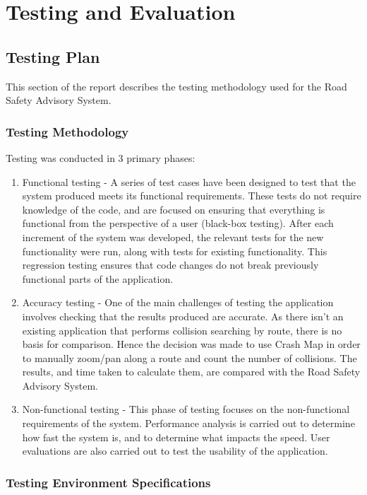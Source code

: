 \documentclass[authoryearcitations]{UoYCSproject}
\begin{document}
\chapter{Testing and Evaluation}

\section{Testing Plan}

This section of the report describes the testing methodology used for the Road Safety Advisory System.

\subsection{Testing Methodology}

Testing was conducted in 3 primary phases:

\begin{enumerate}
	\item Functional testing - A series of test cases have been designed to test that the system produced meets its functional requirements. These tests do not require knowledge of the code, and are focused on ensuring that everything is functional from the perspective of a user (black-box testing). After each increment of the system was developed, the relevant tests for the new functionality were run, along with tests for existing functionality. This regression testing ensures that code changes do not break previously functional parts of the application.
	\item Accuracy testing - One of the main challenges of testing the application involves checking that the results produced are accurate. As there isn't an existing application that performs collision searching by route, there is no basis for comparison. Hence the decision was made to use Crash Map \citep{crashmap} in order to manually zoom/pan along a route and count the number of collisions. The results, and time taken to calculate them, are compared with the Road Safety Advisory System.
	\item Non-functional testing - This phase of testing focuses on the non-functional requirements of the system. Performance analysis is carried out to determine how fast the system is, and to determine what impacts the speed. User evaluations are also carried out to test the usability of the application.
\end{enumerate}

\subsection{Testing Environment Specifications}
\end{document}
